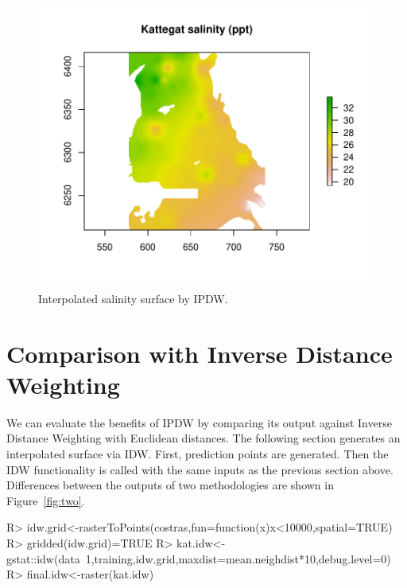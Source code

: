 \documentclass[nojss,shortnames]{jss}
\begin{document}
\begin{figure}[h!]
\begin{center}
\includegraphics{ipdw-figure1}
\end{center}
\vspace{-20pt}
\caption{Interpolated salinity surface by IPDW.}
\label{fig:one}
\end{figure}
\FloatBarrier

\section{Comparison with Inverse Distance Weighting}

We can evaluate the benefits of IPDW by comparing its output against Inverse Distance Weighting with Euclidean distances. The following section generates an interpolated surface via IDW. First, prediction points are generated. Then the  \citep{peb2004} IDW functionality is called with the same inputs as the previous section above. Differences between the outputs of two methodologies are shown in Figure~\ref{fig:two}.

\begin{Schunk}
\begin{Sinput}
R> idw.grid<-rasterToPoints(costras,fun=function(x){x<10000},spatial=TRUE)
R> gridded(idw.grid)=TRUE
R> kat.idw<-gstat::idw(data~1,training,idw.grid,maxdist=mean.neighdist*10,debug.level=0)
R> final.idw<-raster(kat.idw)
\end{Sinput}
\end{Schunk}
\end{document}
